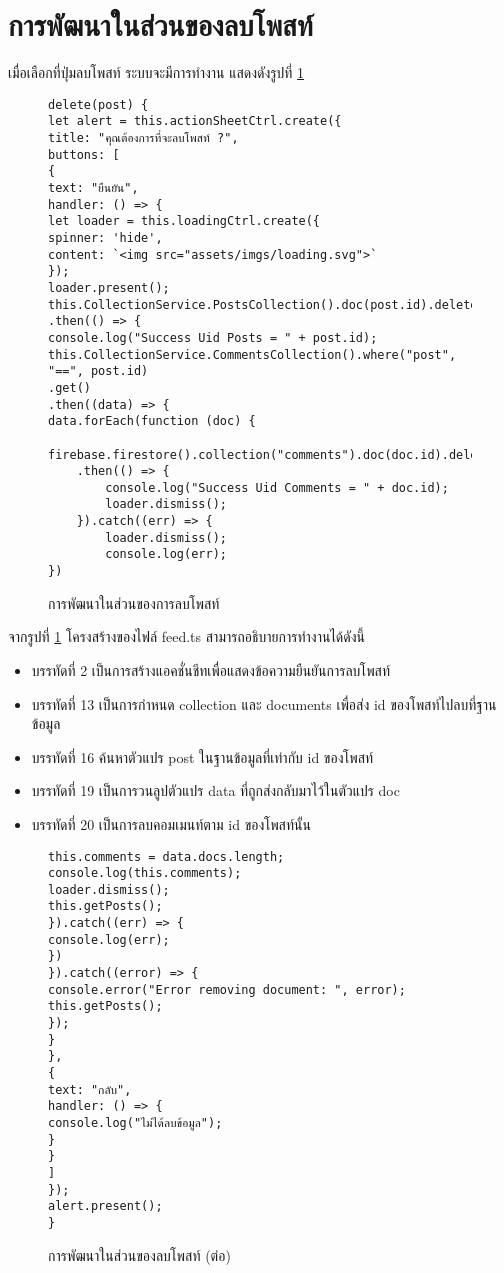 

\section{การพัฒนาในส่วนของลบโพสท์}
เมื่อเลือกที่ปุ่มลบโพสท์ ระบบจะมีการทำงาน แสดงดังรูปที่ \ref{Fig:4-deletepost}

\begin{figure}[H]
{\lstset{language=Pascal}
\begin{lstlisting}
delete(post) {
let alert = this.actionSheetCtrl.create({
title: "คุณต้องการที่จะลบโพสท์ ?",
buttons: [
{
text: "ยืนยัน",
handler: () => {
let loader = this.loadingCtrl.create({
spinner: 'hide',
content: `<img src="assets/imgs/loading.svg">`
});
loader.present();
this.CollectionService.PostsCollection().doc(post.id).delete()
.then(() => {
console.log("Success Uid Posts = " + post.id);
this.CollectionService.CommentsCollection().where("post", "==", post.id)
.get()
.then((data) => {
data.forEach(function (doc) {
	firebase.firestore().collection("comments").doc(doc.id).delete()
	.then(() => {
		console.log("Success Uid Comments = " + doc.id);
		loader.dismiss();
	}).catch((err) => {
		loader.dismiss();
		console.log(err);
})
\end{lstlisting}}
\caption{การพัฒนาในส่วนของการลบโพสท์}
\label{Fig:4-deletepost}
\end{figure}
\newpage

จากรูปที่ \ref{Fig:4-deletepost} โครงสร้างของไฟล์ feed.ts สามารถอธิบายการทำงานได้ดังนี้
\begin{itemize}[label={--}]
\item บรรทัดที่ 2 เป็นการสร้างแอคชั่นชีทเพื่อแสดงข้อความยืนยันการลบโพสท์
\item บรรทัดที่ 13 เป็นการกำหนด collection และ documents เพื่อส่ง id ของโพสท์ไปลบที่ฐานข้อมูล
\item บรรทัดที่ 16 ค้นหาตัวแปร post ในฐานข้อมูลที่เท่ากับ id ของโพสท์
\item บรรทัดที่ 19 เป็นการวนลูปตัวแปร data ที่ถูกส่งกลับมาไว้ในตัวแปร doc
\item บรรทัดที่ 20 เป็นการลบคอมเมนท์ตาม id ของโพสท์นั้น
\end{itemize}
\newpage



\begin{figure}[H]
	{\lstset{language=Pascal}
	\begin{lstlisting}
this.comments = data.docs.length;
console.log(this.comments);
loader.dismiss();
this.getPosts();
}).catch((err) => {
console.log(err);
})
}).catch((error) => {
console.error("Error removing document: ", error);
this.getPosts();
});
}
},
{
text: "กลับ",
handler: () => {
console.log("ไม่ได้ลบข้อมูล");
}
}
]
});
alert.present();
}
	\end{lstlisting}}
	\caption{การพัฒนาในส่วนของลบโพสท์ (ต่อ)}
	\label{Fig:4-deletepostcon1}
	\end{figure}
	
